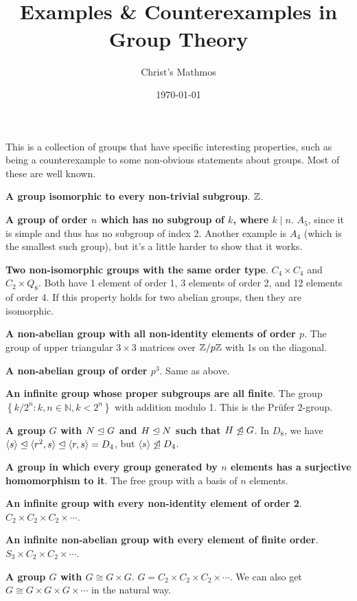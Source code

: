 \documentclass[11pt]{article}
\title{\vspace{-3\baselineskip}\ \\ Examples \& Counterexamples in Group Theory}
\author{Christ's Mathmos}
\date{\today}
\begin{document}
\maketitle

This is a collection of groups that have specific interesting properties, such as being a counterexample to some non-obvious statements about groups. Most of these are well known.

\textbf{A group isomorphic to every non-trivial subgroup}. $\mathbb{Z}$.

\textbf{A group of order $n$ which has no subgroup of $k$, where $k \mid n$}. $A_5$, since it is simple and thus has no subgroup of index 2. Another example is $A_4$ (which is the smallest such group), but it's a little harder to show that it works.

\textbf{Two non-isomorphic groups with the same order type}. $C_4 \times C_4$ and $C_2 \times Q_8$. Both have 1 element of order 1, 3 elements of order 2, and 12 elements of order 4. If this property holds for two abelian groups, then they are isomorphic.

\textbf{A non-abelian group with all non-identity elements of order $p$}. The group of upper triangular $3 \times 3$ matrices over $\mathbb{Z}/p\mathbb{Z}$ with 1s on the diagonal.

\textbf{A non-abelian group of order $p^3$}. Same as above.

\textbf{An infinite group whose proper subgroups are all finite}. The group $\left\{k/2^{n} : k, n \in \mathbb{N}, k<2^{n}\right\}$ with addition modulo 1. This is the Prüfer $2$-group.

\textbf{A group $G$ with $N \trianglelefteq G$ and $H \trianglelefteq N$ such that $H \not \trianglelefteq G$}. In $D_8$, we have $\langle s \rangle \trianglelefteq \langle r^2, s \rangle \trianglelefteq \langle r, s \rangle = D_4$, but $\langle s \rangle \not \trianglelefteq D_4$.

\textbf{A group in which every group generated by $n$ elements has a surjective homomorphism to it}. The free group with a basis of $n$ elements.


\textbf{An infinite group with every non-identity element of order 2}. $C_2 \times C_2 \times C_2 \times \cdots$.

\textbf{An infinite non-abelian group with every element of finite order}. $S_3 \times C_2 \times C_2 \times \cdots$.

\textbf{A group $G$ with $G \cong G \times G$}. $G = C_2 \times C_2 \times C_2 \times \cdots$. We can also get $G \cong G \times G \times G \times \cdots$ in the natural way.
\end{document}
